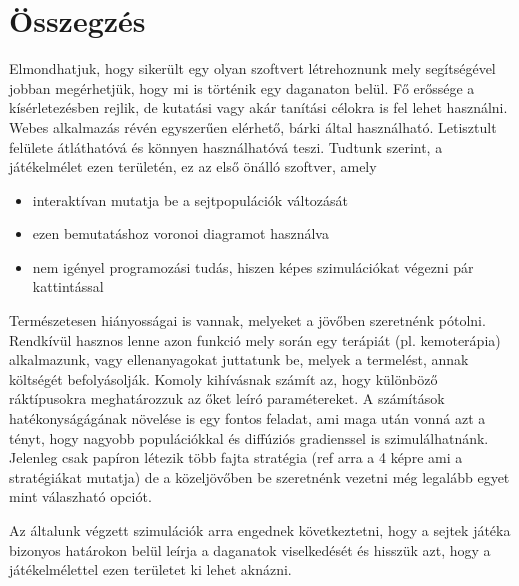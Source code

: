 \section{Összegzés}

Elmondhatjuk, hogy sikerült egy olyan szoftvert létrehoznunk mely segítségével jobban megérhetjük, hogy mi is történik egy daganaton belül. Fő erőssége a kísérletezésben rejlik, de kutatási vagy akár tanítási célokra is fel lehet használni. Webes alkalmazás révén egyszerűen elérhető, bárki által használható. Letisztult felülete átláthatóvá és könnyen használhatóvá teszi. Tudtunk szerint, a játékelmélet ezen területén, ez az első önálló szoftver, amely 
\begin{itemize}[noitemsep]
	\item interaktívan mutatja be a sejtpopulációk változását
	\item ezen bemutatáshoz voronoi diagramot használva
	\item nem igényel programozási tudás, hiszen képes szimulációkat végezni pár kattintással
\end{itemize}

Természetesen hiányosságai is vannak, melyeket a jövőben szeretnénk pótolni. Rendkívül hasznos lenne azon funkció mely során egy terápiát (pl. kemoterápia) alkalmazunk, vagy ellenanyagokat juttatunk be, melyek a termelést, annak költségét befolyásolják. Komoly kihívásnak számít az, hogy különböző ráktípusokra meghatározzuk az őket leíró paramétereket. A számítások hatékonyságágának növelése is egy fontos feladat, ami maga után vonná azt a tényt, hogy nagyobb populációkkal és diffúziós gradienssel is szimulálhatnánk. 
Jelenleg csak papíron létezik több fajta stratégia (ref arra a 4 képre ami a stratégiákat mutatja) de a közeljövőben be szeretnénk vezetni még legalább egyet mint válaszható opciót.

Az általunk végzett szimulációk arra engednek következtetni, hogy a sejtek játéka bizonyos határokon belül leírja a daganatok viselkedését és hisszük azt, hogy a játékelmélettel ezen területet ki lehet aknázni.